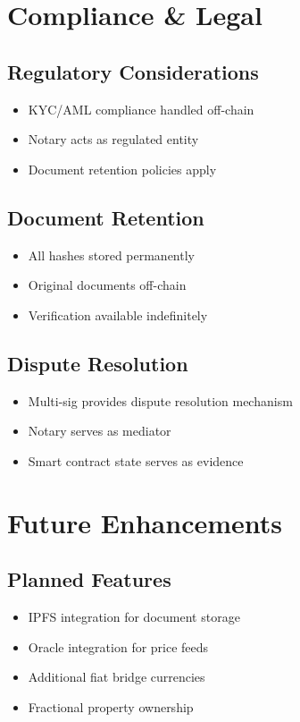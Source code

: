 \documentclass[12pt,a4paper]{article}
\begin{document}
\section{Compliance \& Legal}

\subsection{Regulatory Considerations}
\begin{itemize}
\item KYC/AML compliance handled off-chain
\item Notary acts as regulated entity
\item Document retention policies apply
\end{itemize}

\subsection{Document Retention}
\begin{itemize}
\item All hashes stored permanently
\item Original documents off-chain
\item Verification available indefinitely
\end{itemize}

\subsection{Dispute Resolution}
\begin{itemize}
\item Multi-sig provides dispute resolution mechanism
\item Notary serves as mediator
\item Smart contract state serves as evidence
\end{itemize}

\section{Future Enhancements}

\subsection{Planned Features}
\begin{itemize}
\item IPFS integration for document storage
\item Oracle integration for price feeds
\item Additional fiat bridge currencies
\item Fractional property ownership
\end{itemize}
\end{document}
